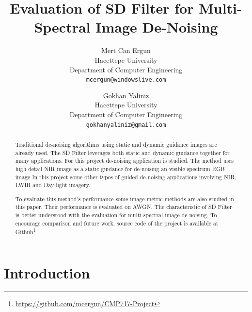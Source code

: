 \documentclass[10pt,twocolumn,letterpaper]{article}
\begin{document}
	
	\title{Evaluation of SD Filter for Multi-Spectral Image De-Noising}
	
	\author{Mert Can Ergun\\
		Hacettepe University\\
		Department of Computer Engineering\\
		{\tt\small mcergun@windowslive.com}
		\and
		Gokhan Yaliniz\\
		Hacettepe University\\
		Department of Computer Engineering\\
		{\tt\small gokhanyaliniz@gmail.com}
	}
	
	\maketitle
	
	\begin{abstract}
		Traditional de-noising algorithms using static and dynamic guidance images are already used. The SD Filter leverages both static and dynamic guidance together for many applications. For this project de-noising application is studied. The method uses high detail NIR image as a static guidance for de-noising an visible spectrum RGB image\cite{ham2015robust} In this project some other types of guided de-noising applications involving NIR, LWIR and Day-light imagery.
		
		To evaluate this method's performance some image metric methods are also studied in this paper. Their performance is evaluated on AWGN.
		The characteristic of SD Filter\cite{ham2015robust} is better understood with the evaluation for multi-spectral image de-noising.
		 To encourage comparison and future work, source code of the project is available at Github\footnote{\href{https://github.com/mcergun/CMP717-Project}{https://github.com/mcergun/CMP717-Project}}
	\end{abstract}
	
	\section{Introduction}
	
\end{document}
